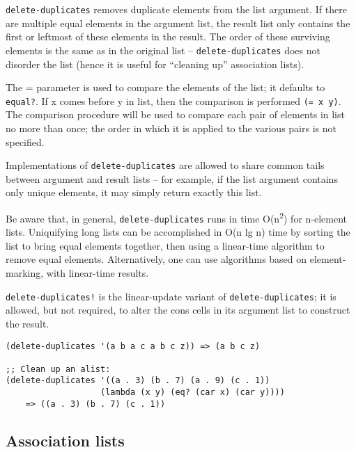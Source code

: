 \begin{entry}{%
  }

  \texttt{delete-duplicates} removes duplicate elements from the list
  argument. If there are multiple equal elements in the argument list,
  the result list only contains the first or leftmost of these
  elements in the result. The order of these surviving elements is the
  same as in the original list -- \texttt{delete-duplicates} does not
  disorder the list (hence it is useful for ``cleaning up''
  association lists).

  The = parameter is used to compare the elements of the list; it
  defaults to \texttt{equal?}. If x comes before y in list, then the
  comparison is performed \texttt{(=\ x\ y)}. The comparison procedure
  will be used to compare each pair of elements in list no more than
  once; the order in which it is applied to the various pairs is not
  specified.

  Implementations of \texttt{delete-duplicates} are allowed to share
  common tails between argument and result lists -- for example, if
  the list argument contains only unique elements, it may simply
  return exactly this list.

  Be aware that, in general, \texttt{delete-duplicates} runs in time
  O(n\textsuperscript{2}) for n-element lists. Uniquifying long lists
  can be accomplished in O(n lg n) time by sorting the list to bring
  equal elements together, then using a linear-time algorithm to
  remove equal elements. Alternatively, one can use algorithms based
  on element-marking, with linear-time results.

  \texttt{delete-duplicates!} is the linear-update variant of
  \texttt{delete-duplicates}; it is allowed, but not required, to
  alter the cons cells in its argument list to construct the result.

\begin{verbatim}
(delete-duplicates '(a b a c a b c z)) => (a b c z)

;; Clean up an alist:
(delete-duplicates '((a . 3) (b . 7) (a . 9) (c . 1))
                   (lambda (x y) (eq? (car x) (car y))))
    => ((a . 3) (b . 7) (c . 1))
\end{verbatim}
\end{entry}

\subsection{{Association lists}}

